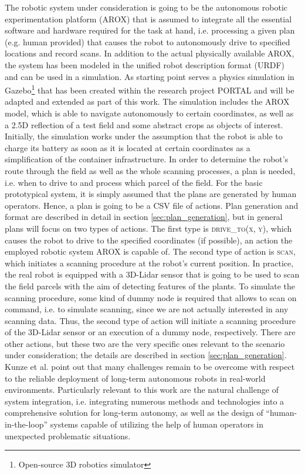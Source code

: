 \documentclass[english, master, utf8]{base/thesis_KBS}
\begin{document}
The robotic system under consideration is going to be the autonomous robotic experimentation platform (AROX) \cite{Kisliuk:2021} that is assumed to integrate 
all the essential software and hardware required for the task at hand, i.e. processing a given plan (e.g. human provided) that causes the robot to autonomously
drive to specified locations and record scans. In addition to the actual physically available AROX, the system has been modeled in the unified robot description 
format (URDF) and can be used in a simulation. As starting point serves a physics simulation in Gazebo\footnote{Open-source 3D robotics simulator} that 
has been created within the research project PORTAL \cite{portal} and will be adapted and extended as part of this work. 
The simulation includes the AROX model, which is able to navigate autonomously to certain coordinates, as well as a 2.5D 
reflection of a test field and some abstract crops as objects of interest. Initially, the simulation works under the assumption that the robot is able to charge its 
battery as soon as it is located at certain coordinates as a simplification of the container infrastructure.
In order to determine the robot's route through the field as well as the whole scanning processes, a plan is needed, i.e. when to drive to and process which parcel of the field. 
For the basic prototypical system, it is simply assumed that the plans are generated by human operators. Hence, a plan is going to be a CSV file of actions.
Plan generation and format are described in detail in section \ref{sec:plan_generation}, but in general plans will focus on two types of actions.
The first type is \textsc{drive\_to(x, y)}, which causes the robot to drive to the specified coordinates (if possible), an action the employed robotic system 
AROX is capable of. The second type of action is \textsc{scan}, which initiates a scanning procedure at the robot's current position.
In practice, the real robot is equipped with a 3D-Lidar sensor that is going to be used to scan the field parcels with the aim of detecting features of the plants. 
To simulate the scanning procedure, some kind of dummy node is required that allows to scan on command, i.e. to simulate scanning, since we are not actually interested
in any scanning data. Thus, the second type of action will initiate a scanning procedure of the 3D-Lidar sensor or an execution of a dummy node, respectively.
There are other actions, but these two are the very specific ones relevant to the scenario under consideration; the details are described in section \ref{sec:plan_generation}.\newline
Kunze et al. point out that many challenges remain to be overcome with respect to the reliable deployment of long-term autonomous robots in real-world environments.
Particularly relevant to this work are the natural challenge of system integration, i.e. integrating numerous methods and technologies into a comprehensive solution 
for long-term autonomy, as well as the design of ``human-in-the-loop'' systems capable of utilizing the help of human operators in unexpected problematic situations. \cite{Kunze:2018}
\end{document}
